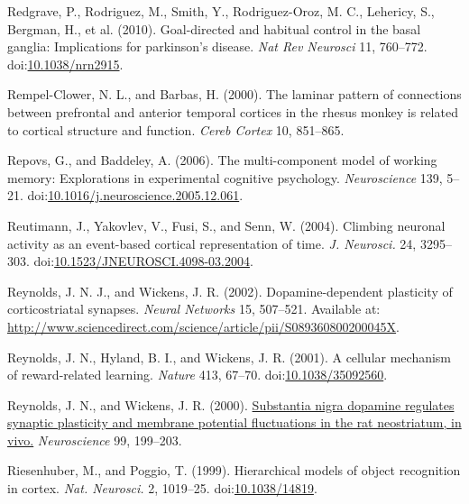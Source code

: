 \documentclass[
  11pt,
  a4paper,
]{scrbook}
\newlength{\cslhangindent}
\newenvironment{CSLReferences}[2] %
 {\begin{list}{}{%
  \setlength{\itemindent}{0pt}
  \setlength{\leftmargin}{0pt}
  \setlength{\parsep}{0pt}
  \ifodd #1
   \setlength{\leftmargin}{\cslhangindent}
   \setlength{\itemindent}{-1\cslhangindent}
  \fi
  \setlength{\itemsep}{#2\baselineskip}}}
 {\end{list}}
\begin{document}
\begin{CSLReferences}{1}{1}
Redgrave, P., Rodriguez, M., Smith, Y., Rodriguez-Oroz, M. C., Lehericy,
S., Bergman, H., et al. (2010). Goal-directed and habitual control in
the basal ganglia: Implications for parkinson's disease. \emph{Nat Rev
Neurosci} 11, 760--772.
doi:\href{https://doi.org/10.1038/nrn2915}{10.1038/nrn2915}.

Rempel-Clower, N. L., and Barbas, H. (2000). The laminar pattern of
connections between prefrontal and anterior temporal cortices in the
rhesus monkey is related to cortical structure and function. \emph{Cereb
Cortex} 10, 851--865.

Repovs, G., and Baddeley, A. (2006). The multi-component model of
working memory: Explorations in experimental cognitive psychology.
\emph{Neuroscience} 139, 5--21.
doi:\href{https://doi.org/10.1016/j.neuroscience.2005.12.061}{10.1016/j.neuroscience.2005.12.061}.

Reutimann, J., Yakovlev, V., Fusi, S., and Senn, W. (2004). {Climbing
neuronal activity as an event-based cortical representation of time.}
\emph{J. Neurosci.} 24, 3295--303.
doi:\href{https://doi.org/10.1523/JNEUROSCI.4098-03.2004}{10.1523/JNEUROSCI.4098-03.2004}.

Reynolds, J. N. J., and Wickens, J. R. (2002). {Dopamine-dependent
plasticity of corticostriatal synapses}. \emph{Neural Networks} 15,
507--521. Available at:
\url{http://www.sciencedirect.com/science/article/pii/S089360800200045X}.

Reynolds, J. N., Hyland, B. I., and Wickens, J. R. (2001). A cellular
mechanism of reward-related learning. \emph{Nature} 413, 67--70.
doi:\href{https://doi.org/10.1038/35092560}{10.1038/35092560}.

Reynolds, J. N., and Wickens, J. R. (2000).
\href{https://www.ncbi.nlm.nih.gov/pubmed/10938425}{Substantia nigra
dopamine regulates synaptic plasticity and membrane potential
fluctuations in the rat neostriatum, in vivo.} \emph{Neuroscience} 99,
199--203.

Riesenhuber, M., and Poggio, T. (1999). {Hierarchical models of object
recognition in cortex.} \emph{Nat. Neurosci.} 2, 1019--25.
doi:\href{https://doi.org/10.1038/14819}{10.1038/14819}.


\end{CSLReferences}
\end{document}
